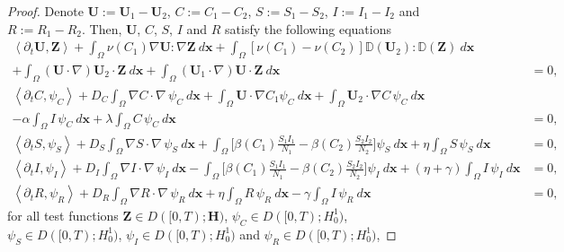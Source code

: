 \documentclass[10pt,number,preprint,times]{elsarticle}
\numberwithin{equation}{section} %
\begin{document}
\begin{proof}
		\noindent
{Denote $\boldsymbol{U}:= \boldsymbol{U}_1 - \boldsymbol{U}_2$,  $C:= C_1 - C_2$, $S:= S_1 - S_2$, $I:= I_1 - I_2$ and $R:= R_1 - R_2$.   
		 Then, $\boldsymbol{U}$, $C$, $S$, $I$ and  $R$ satisfy the following equations}
		\begin{eqnarray}
			\left\langle\partial_{t}\boldsymbol{U}, \boldsymbol{Z}\right\rangle+ \int_{\Omega} \nu(C_1) \nabla \boldsymbol{U}: \nabla \boldsymbol{Z}~d{\mathbf{x}}+\int_{\Omega}\left[\nu(C_1)-\nu\left(C_{2}\right)\right] \mathbb{D}(\boldsymbol{U}_{2}): \mathbb{D}(\boldsymbol{Z}) ~d{\mathbf{x}}&
			\nonumber\\
			+\int_{\Omega}( \boldsymbol{U}\cdot \nabla) \boldsymbol{U}_{2}\cdot \boldsymbol{Z}~d{\mathbf{x}}+\int_{\Omega}( \boldsymbol{U}_1\cdot \nabla) \boldsymbol{U}\cdot \boldsymbol{Z}~d{\mathbf{x}}
			&=0, \;\;\label{uni1} \\  
			\left\langle\partial_tC, \psi_C\right\rangle+D_C\int_{\Omega}\nabla C\cdot\nabla\, \psi_C~d{\mathbf{x}}+\int_{\Omega}\boldsymbol{U}\cdot\nabla C_1 \psi_C~d{\mathbf{x}}+\int_{\Omega} \boldsymbol{U}_{2} \cdot\nabla C\, \psi_C~d{\mathbf{x}}
			&
			\nonumber\\
			-\alpha\int_{\Omega} I\, \psi_C~d{\mathbf{x}}+\lambda\int_{\Omega} C\, \psi_C~d{\mathbf{x}}
			&=0,\label{uni2} \\ 
			\left\langle\partial_tS, \psi_S\right\rangle+D_S\int_{\Omega}\nabla S\cdot\nabla\, \psi_S ~d{\mathbf{x}}+\int_{\Omega}\Big[\beta(C_1)\frac{S_1 I_1}{N_1}-\beta(C_2)\frac{S_2 I_2}{N_2}\Big]\psi_S~d{\mathbf{x}}
			+\eta\int_{\Omega} S\, \psi_S~d{\mathbf{x}}&= 0, \;\;\label{uni3}
			\\ 
			\left\langle\partial_t I, \psi_I\right\rangle+D_I\int_{\Omega}\nabla I\cdot\nabla\, \psi_I ~d{\mathbf{x}}-\int_{\Omega}\Big[\beta(C_1)\frac{S_1 I_1}{N_1}-\beta(C_2)\frac{S_2 I_2}{N_2}\Big]\psi_I~d{\mathbf{x}}
			+(\eta+\gamma)\int_{\Omega} I\, \psi_I~d{\mathbf{x}}&= 0, \;\;\label{uni4}
			\\ 
			\left\langle\partial_tR, \psi_R\right\rangle+D_R\int_{\Omega}\nabla R\cdot\nabla\, \psi_R ~d{\mathbf{x}}
			+\eta\int_{\Omega} R\, \psi_R~d{\mathbf{x}}-\gamma\int_{\Omega} I\, \psi_R~d{\mathbf{x}}&= 0, \;\;\label{uni5}
		\end{eqnarray} 
		for all test functions  
		$\boldsymbol{Z} \in D([0,T); \mathbf{H})$, $\psi_C \in D([0,T);  H^1_0)$, $\psi_S \in D([0,T);  H^1_0)$, $\psi_I \in D([0,T);  H^1_0)$ 
		and $\psi_R \in D([0,T);  H^1_0)$,  

\end{proof}
\end{document}
